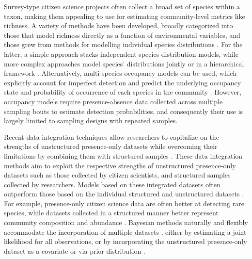 \documentclass[preprint,review,times,12pt,3p]{elsarticle}
\begin{document}
Survey-type citizen science projects often collect a broad set of species within a taxon, making them appealing to use for estimating community-level metrics like richness. A variety of methods have been developed, broadly categorized into those that model richness directly as a function of environmental variables, and those grew from methods for modelling individual species distributions \citep{Dubuis2011,Guisan2011,Calabrese2014,Biber2019}. For the latter, a simple approach stacks independent species distribution models, while more complex approaches model species' distributions jointly or in a hierarchical framework \citep{Caradima2019}. Alternatively, multi-species occupancy models can be used, which explicitly account for imperfect detection and predict the underlying occupancy state and probability of occurrence of each species in the community \citep{Frishkoff2019,Guillera-Arroita2019,Szewczyk2018,Devarajan2020}. However, occupancy models require presence-absence data collected across multiple sampling bouts to estimate detection probabilities, and consequently their use is largely limited to sampling designs with repeated samples.

Recent data integration techniques allow researchers to capitalize on the strengths of unstructured presence-only datasets while overcoming their limitations by combining them with structured samples \citep{Isaac2019,Miller2019}. These data integration methods aim to exploit the respective strengths of unstructured presence-only datasets such as those collected by citizen scientists, and structured samples collected by researchers. Models based on these integrated datasets often outperform those based on the individual structured and unstructured datasets \citep{Dorazio2014b,Fithian2015,Koshkina2017a}. For example, presence-only citizen science data are often better at detecting rare species, while datasets collected in a structured manner better represent community composition and abundance \citep{Steen2019,Henckel2020,Pernat2020}. Bayesian methods naturally and flexibly accommodate the incorporation of multiple datasets \citep{Clark2005,BeckEtAl2012,Szewczyk2018}, either by estimating a joint likelihood for all observations, or by incorporating the unstructured presence-only dataset as a covariate or via prior distribution \citep{Fletcher2019,Isaac2019,Miller2019}. 
\end{document}
